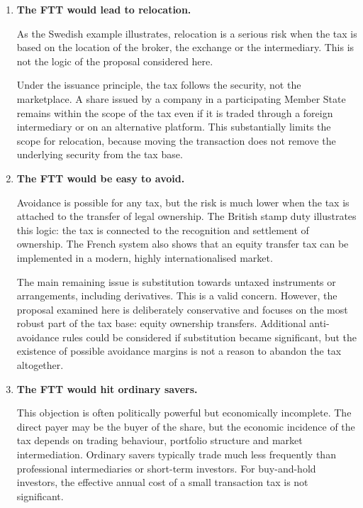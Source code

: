 \documentclass[../../main]{subfiles}
\begin{document}
\begin{enumerate}
    Competitiveness concerns should therefore be assessed in relation to the design of the tax. A badly designed tax can create distortions. A tax based on the issuance principle, applied at a moderate rate and limited to equity transfers, is much less likely to damage competitiveness than a tax based only on the location of intermediaries or trading venues.

    \item \textbf{The FTT would lead to relocation.}

As the Swedish example illustrates, relocation is a serious risk when the tax is based on the location of the broker, the exchange or the intermediary. This is not the logic of the proposal considered here.

Under the issuance principle, the tax follows the security, not the marketplace. A share issued by a company in a participating Member State remains within the scope of the tax even if it is traded through a foreign intermediary or on an alternative platform. This substantially limits the scope for relocation, because moving the transaction does not remove the underlying security from the tax base.

    \item \textbf{The FTT would be easy to avoid.}

    Avoidance is possible for any tax, but the risk is much lower when the tax is attached to the transfer of legal ownership. The British stamp duty illustrates this logic: the tax is connected to the recognition and settlement of ownership. The French system also shows that an equity transfer tax can be implemented in a modern, highly internationalised market.

    The main remaining issue is substitution towards untaxed instruments or arrangements, including derivatives. This is a valid concern. However, the proposal examined here is deliberately conservative and focuses on the most robust part of the tax base: equity ownership transfers. Additional anti-avoidance rules could be considered if substitution became significant, but the existence of possible avoidance margins is not a reason to abandon the tax altogether.

    \item \textbf{The FTT would hit ordinary savers.}

    This objection is often politically powerful but economically incomplete. The direct payer may be the buyer of the share, but the economic incidence of the tax depends on trading behaviour, portfolio structure and market intermediation. Ordinary savers typically trade much less frequently than professional intermediaries or short-term investors. For buy-and-hold investors, the effective annual cost of a small transaction tax is not significant.


\end{enumerate}
\end{document}
